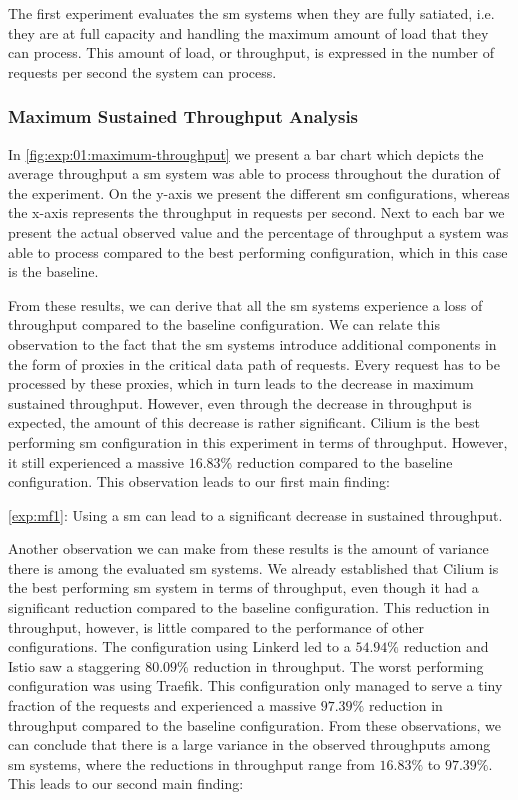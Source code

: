 The first experiment evaluates the \gls{sm} systems when they are fully satiated, i.e. they are at full capacity and handling the maximum amount of load that they can process. This amount of load, or throughput, is expressed in the number of requests per second the system can process.

\subsubsection{Maximum Sustained Throughput Analysis}
\label{sec:experiments:results:per-experiment:01:throughput}

In \cref{fig:exp:01:maximum-throughput} we present a bar chart which depicts the average throughput a \gls{sm} system was able to process throughout the duration of the experiment. On the y-axis we present the different \gls{sm} configurations, whereas the x-axis represents the throughput in requests per second. Next to each bar we present the actual observed value and the percentage of throughput a system was able to process compared to the  best performing configuration, which in this case is the baseline.

From these results, we can derive that all the \gls{sm} systems experience a loss of throughput compared to the baseline configuration. We can relate this observation to the fact that the \gls{sm} systems introduce additional components in the form of proxies in the critical data path of requests. Every request has to be processed by these proxies, which in turn leads to the decrease in maximum sustained throughput. However, even through the decrease in throughput is expected, the amount of this decrease is rather significant. Cilium is the best performing \gls{sm} configuration in this experiment in terms of throughput. However, it still experienced a massive $16.83\%$ reduction compared to the baseline configuration. This observation leads to our first main finding: 

\begin{shaded*}
    \noindent
    \ref{exp:mf1}: 
    Using a \gls{sm} can lead to a significant decrease in sustained throughput.
\end{shaded*}

Another observation we can make from these results is the amount of variance there is among the evaluated \gls{sm} systems. We already established that Cilium is the best performing \gls{sm} system in terms of throughput, even though it had a significant reduction compared to the baseline configuration. This reduction in throughput, however, is little compared to the performance of other configurations. The configuration using Linkerd led to a $54.94\%$ reduction and Istio saw a staggering $80.09\%$ reduction in throughput. The worst performing configuration was using Traefik. This configuration only managed to serve a tiny fraction of the requests and experienced a massive $97.39\%$ reduction in throughput compared to the baseline configuration. From these observations, we can conclude that there is a large variance in the observed throughputs among \gls{sm} systems, where the reductions in throughput range from $16.83\%$ to $97.39\%$. This leads to our second main finding:

